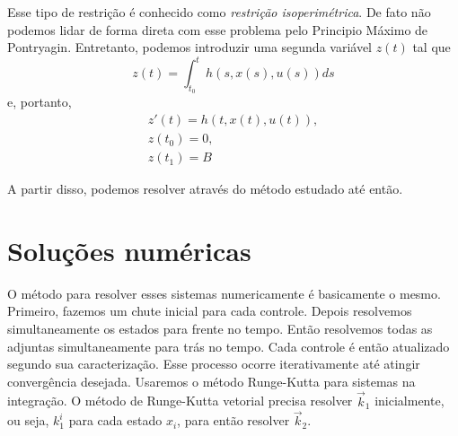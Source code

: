 Esse tipo de restrição é conhecido como \textit{restrição isoperimétrica}. De
fato não podemos lidar de forma direta com esse problema pelo Principio Máximo
de Pontryagin. Entretanto, podemos introduzir uma segunda variável $z(t)$ tal
que 
$$
z(t) = \int_{t_0}^t h(s,x(s),u(s))ds
$$
e, portanto, 
\begin{gather*}
    z'(t) = h(t,x(t),u(t)), \\
    z(t_0) = 0, \\
    z(t_1) = B
\end{gather*}

A partir disso, podemos resolver através do método estudado até então. 

\section{Soluções numéricas}

O método para resolver esses sistemas numericamente é basicamente o mesmo.
Primeiro, fazemos um chute inicial para cada controle. Depois resolvemos
simultaneamente os estados para frente no tempo. Então resolvemos todas as
adjuntas simultaneamente para trás no tempo. Cada controle é então atualizado
segundo sua caracterização. Esse processo ocorre iterativamente até atingir
convergência desejada. Usaremos o método Runge-Kutta para sistemas na
integração. O método de Runge-Kutta vetorial precisa resolver $\vec{k}_1$
inicialmente, ou seja, $k_1^i$ para cada estado $x_i$, para então resolver
$\vec{k}_2$. 